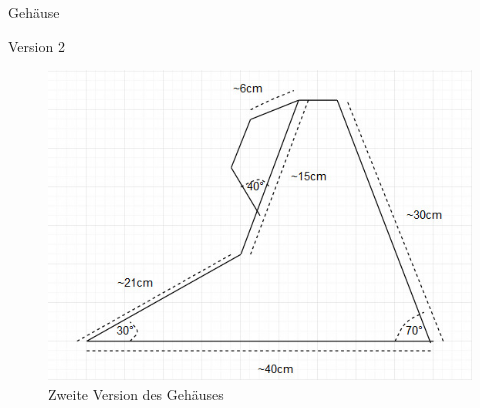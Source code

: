 \documentclass[mathserif,9pt]{beamer}
\begin{document}
    \begin{frame}{Gehäuse}
        \begin{block}{Version 2}
            \begin{figure}
                \centering
                \includegraphics[height=0.5\paperheight]{img/gehause-version2.jpeg}
                \caption{Zweite Version des Geh\"auses}
                \label{fig:gehausev2}
            \end{figure}
        \end{block}
    \end{frame}
\end{document}
